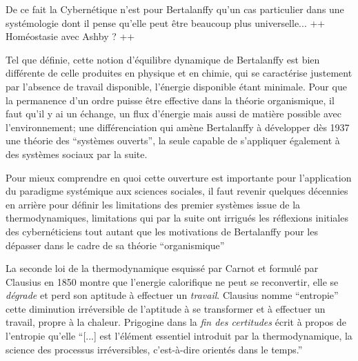 De ce fait la Cybernétique n'est pour Bertalanffy qu'un cas particulier dans une systémologie dont il pense qu'elle peut être beaucoup plus universelle... ++ Homéostasie avec Ashby ? ++

Tel que définie, cette notion d'équilibre dynamique de Bertalanffy est bien différente de celle produites en physique et en chimie, qui se caractérise justement par l'absence de travail disponible, l'énergie disponible étant minimale. Pour que la permanence d'un ordre puisse être effective dans la théorie organismique, il faut qu'il y ai un échange, un flux d'énergie mais aussi de matière possible avec l'environnement; une différenciation qui amène Bertalanffy à développer dès 1937 une théorie des \enquote{systèmes ouverts}, la seule capable de s'appliquer également à des systèmes sociaux par la suite.

Pour mieux comprendre en quoi cette ouverture est importante pour l'application du paradigme systémique aux sciences sociales, il faut revenir quelques décennies en arrière pour définir les limitations des premier systèmes issue de la thermodynamiques, limitations qui par la suite ont irrigués les réflexions initiales des cybernéticiens tout autant que les motivations de Bertalanffy pour les dépasser dans le cadre de sa théorie \enquote{organismique}

La seconde loi de la thermodynamique esquissé par Carnot et formulé par Clausius en 1850 montre que l'energie calorifique ne peut se reconvertir, elle se \textit{dégrade} et perd son aptitude à effectuer un \textit{travail}. Clausius nomme \enquote{entropie} cette diminution irréversible de l'aptitude à se transformer et à effectuer un travail, propre à la chaleur.\autocite[35]{Morin1977} Prigogine dans la \textit{fin des certitudes} écrit à propos de l'entropie qu'elle \enquote{[...] est l’élément essentiel introduit par la thermodynamique, la science des processus irréversibles, c’est-à-dire orientés dans le temps.}

